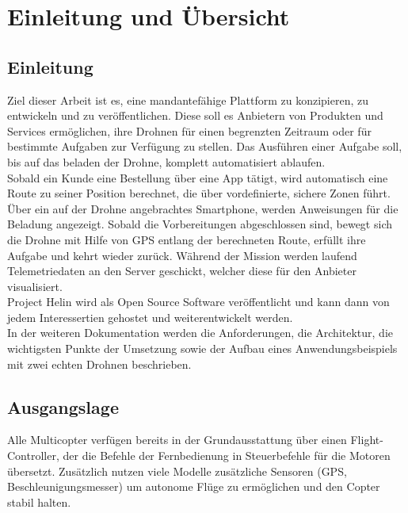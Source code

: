 \chapter{Einleitung und Übersicht}

\section{Einleitung}

Ziel dieser Arbeit ist es, eine mandantefähige Plattform zu konzipieren, zu entwickeln und zu veröffentlichen. Diese soll es Anbietern von Produkten und Services ermöglichen, ihre Drohnen für einen begrenzten Zeitraum oder für bestimmte Aufgaben zur Verfügung zu stellen. Das Ausführen einer Aufgabe soll, bis auf das beladen der Drohne, komplett automatisiert ablaufen. \\

Sobald ein Kunde eine Bestellung über eine App tätigt, wird automatisch eine Route zu seiner Position berechnet, die über vordefinierte, sichere Zonen führt. Über ein auf der Drohne angebrachtes Smartphone, werden Anweisungen für die Beladung angezeigt. Sobald die Vorbereitungen abgeschlossen sind, bewegt sich die Drohne mit Hilfe von GPS entlang der berechneten Route, erfüllt ihre Aufgabe und kehrt wieder zurück. Während der Mission werden laufend Telemetriedaten an den Server geschickt, welcher diese für den Anbieter visualisiert.\\

Project Helin wird als Open Source Software veröffentlicht und kann dann von jedem Interessertien gehostet und weiterentwickelt werden.\\

In der weiteren Dokumentation werden die Anforderungen, die Architektur, die wichtigsten Punkte der Umsetzung sowie der Aufbau eines Anwendungsbeispiels mit zwei echten Drohnen beschrieben.

\section{Ausgangslage}

Alle Multicopter verfügen bereits in der Grundausstattung über einen \Gls{Flight-Controller}, der die Befehle der Fernbedienung in Steuerbefehle für die Motoren übersetzt. Zusätzlich nutzen viele Modelle zusätzliche Sensoren (GPS, Beschleunigungsmesser) um autonome Flüge zu ermöglichen und den Copter stabil halten. \\

